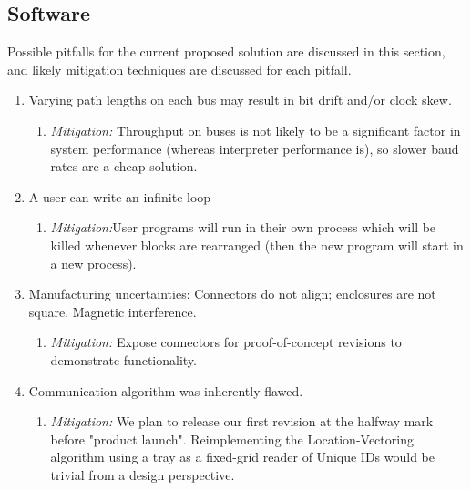  \subsection{Software}
    Possible pitfalls for the current proposed solution are discussed in this section, and likely mitigation techniques are discussed for each pitfall.
    \begin{enumerate}

      \item Varying path lengths on each bus may result in bit drift and/or clock skew.
      \begin{enumerate}
        \item \textit{Mitigation:} Throughput on buses is not likely to be a significant factor in system performance (whereas interpreter performance is), so slower baud rates are a cheap solution.
      \end{enumerate}


      \item A user can write an infinite loop
      \begin{enumerate}
        \item \textit{Mitigation:}User programs will run in their own process which will be killed whenever blocks are rearranged (then the new program will start in a new process).
      \end{enumerate}

      \item Manufacturing uncertainties: Connectors do not align; enclosures are not square. Magnetic interference.
      \begin{enumerate}
        \item \textit{Mitigation:} Expose connectors for proof-of-concept revisions to demonstrate functionality.
      \end{enumerate}

      \item Communication algorithm was inherently flawed.
      \begin{enumerate}
        \item \textit{Mitigation:} We plan to release our first revision at the halfway mark before "product launch". Reimplementing the Location-Vectoring algorithm using a tray as a fixed-grid reader of Unique IDs would be trivial from a design perspective.
      \end{enumerate}

    \end{enumerate}
